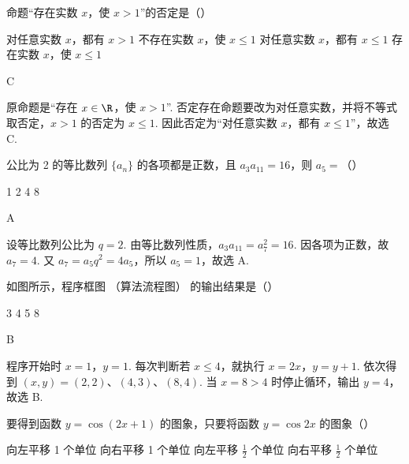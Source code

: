 \begin{problem}
命题“存在实数 \(x\)，使 \(x > 1\)”的否定是（\quad）

\choices
    {对任意实数 \(x\)，都有 \(x > 1\)}
    {不存在实数 \(x\)，使 \(x \leqslant 1\)}
    {对任意实数 \(x\)，都有 \(x \leqslant 1\)}
    {存在实数 \(x\)，使 \(x \leqslant 1\)}
\end{problem}

\begin{answer}
C
\end{answer}

\begin{solution}
原命题是“存在 \(x\in\R\)，使 \(x>1\)”. 否定存在命题要改为对任意实数，并将不等式取否定，\(x>1\) 的否定为 \(x\leqslant 1\). 因此否定为“对任意实数 \(x\)，都有 \(x\leqslant 1\)”，故选 C.
\end{solution}

\begin{problem}
公比为 2 的等比数列 \(\{a_{n}\}\) 的各项都是正数，且 \(a_{3}a_{11} = 16\)，则 \(a_{5} =\)（\quad）

\choices
    {1}
    {2}
    {4}
    {8}
\end{problem}

\begin{answer}
A
\end{answer}

\begin{solution}
设等比数列公比为 \(q=2\). 由等比数列性质，\(a_3a_{11}=a_7^2=16\). 因各项为正数，故 \(a_7=4\). 又 \(a_7=a_5q^2=4a_5\)，所以 \(a_5=1\)，故选 A.
\end{solution}

\begin{problem}
如图所示，程序框图 （算法流程图） 的输出结果是（\quad）

\FloatBarrier

\choices
    {3}
    {4}
    {5}
    {8}
\end{problem}

\begin{answer}
B
\end{answer}

\begin{solution}
程序开始时 \(x=1\)，\(y=1\). 每次判断若 \(x\leqslant 4\)，就执行 \(x=2x\)，\(y=y+1\). 依次得到 \((x,y)=(2,2)\)、\((4,3)\)、\((8,4)\). 当 \(x=8>4\) 时停止循环，输出 \(y=4\)，故选 B.
\end{solution}

\begin{problem}
要得到函数 \( y = \cos (2x + 1) \) 的图象，只要将函数 \( y = \cos 2x \) 的图象（\quad）

\choices
    {向左平移 1 个单位}
    {向右平移 1 个单位}
    {向左平移 \(\frac{1}{2}\) 个单位}
    {向右平移 \(\frac{1}{2}\) 个单位}
\end{problem}

